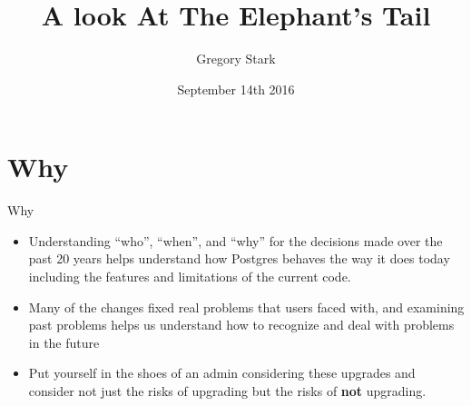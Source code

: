 \documentclass[t,10pt]{beamer}
\title{A look At The Elephant's Tail}
\author{Gregory Stark}
\date{September 14th 2016}
\begin{document}
\begin{frame}[plain]
  \titlepage
\end{frame}

\section{Why}
\begin{frame}{Why}
  \begin{itemize}%
  \item Understanding ``who'', ``when'', and ``why'' for the decisions made
    over the past 20 years helps understand how Postgres behaves the way
    it does today including the features and limitations of the current
    code.
  \item Many of the changes fixed real problems that users faced with,
    and examining past problems helps us understand how to recognize and
    deal with problems in the future
  \item Put yourself in the shoes of an admin considering these upgrades
    and consider not just the risks of upgrading but the risks of
    \textbf{not} upgrading.
  \end{itemize}
\end{frame}
\end{document}
